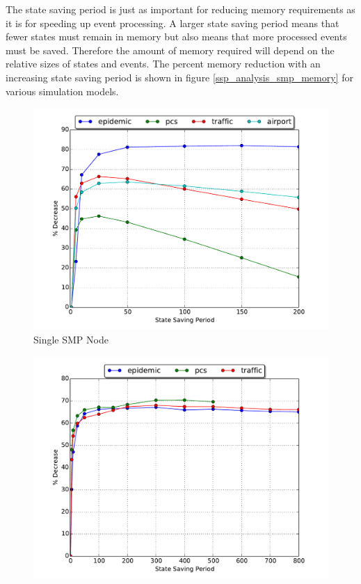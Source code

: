 \documentclass[11pt]{book}
\begin{document}
The state saving period is just as important for reducing memory requirements as it is for
speeding up event processing.  A larger state saving period means that fewer states must remain
in memory but also means that more processed events must be saved.  Therefore the amount of
memory required will depend on the relative sizes of states and events.  The percent memory
reduction with an increasing state saving period is shown in figure \ref{ssp_analysis_smp_memory}
for various simulation models.

\begin{figure}
  \begin{minipage}{.5\textwidth}
    \begin{center}
      \includegraphics[width=\textwidth,keepaspectratio,quiet]{figs/state_saving/bc/percent_memory_decrease.pdf} \\
      Single SMP Node \\
    \end{center}
  \end{minipage}%
  \hfill
  \begin{minipage}{.5\textwidth}
    \begin{center}
      \includegraphics[width=\textwidth,keepaspectratio,quiet]{figs/state_saving/beowulf/percent_memory_decrease.pdf} \\

\end{center}
\end{minipage}
\end{figure}
\end{document}
